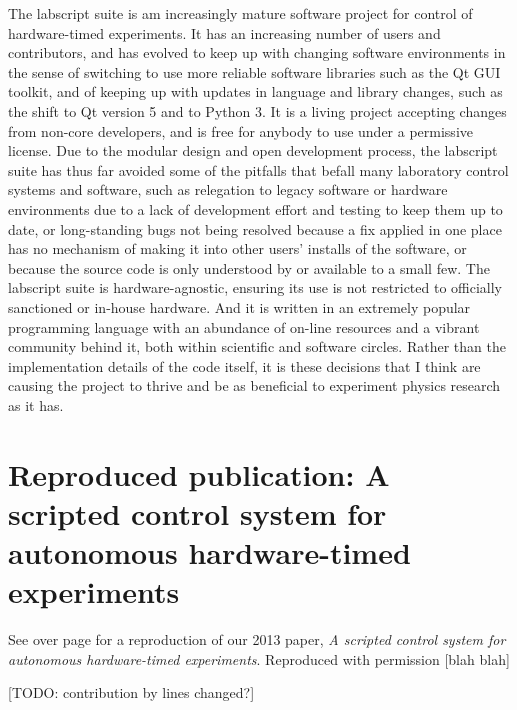The labscript suite is am increasingly mature software project for control of hardware-timed experiments. It has an increasing number of users and contributors, and has evolved to keep up with changing software environments in the sense of switching to use more reliable software libraries such as the Qt GUI toolkit, and of keeping up with updates in language and library changes, such as the shift to Qt version 5 and to Python 3. It is a living project accepting changes from non-core developers, and is free for anybody to use under a permissive license. Due to the modular design and open development process, the labscript suite has thus far avoided some of the pitfalls that befall many laboratory control systems and software, such as relegation to legacy software or hardware environments due to a lack of development effort and testing to keep them up to date, or long-standing bugs not being resolved because a fix applied in one place has no mechanism of making it into other users' installs of the software, or because the source code is only understood by or available to a small few. The labscript suite is hardware-agnostic, ensuring its use is not restricted to officially sanctioned or in-house hardware. And it is written in an extremely popular programming language with an abundance of on-line resources and a vibrant community behind it, both within scientific and software circles. Rather than the implementation details of the code itself, it is these decisions that I think are causing the project to thrive and be as beneficial to experiment physics research as it has.


\section{Reproduced publication: A scripted control system for autonomous hardware-timed experiments}

See over page for a reproduction of our 2013 paper, \emph{A scripted control system for autonomous hardware-timed experiments}. Reproduced with permission [blah blah]


[TODO: contribution by lines changed?]




